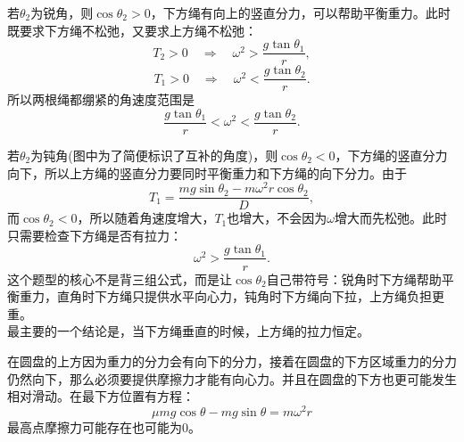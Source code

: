 \begin{casetypebox}[title={\strut\textcolor{white}{\bfseries 常见题型：竖直平面两根绳吊着物体}}]
  若$\theta_2$为锐角，则$\cos\theta_2>0$，下方绳有向上的竖直分力，可以帮助平衡重力。此时既要求下方绳不松弛，又要求上方绳不松弛：
  \[
    T_2>0\quad\Rightarrow\quad
    \omega^2>\frac{g\tan\theta_1}{r},
  \]
  \[
    T_1>0\quad\Rightarrow\quad
    \omega^2<\frac{g\tan\theta_2}{r}.
  \]
  所以两根绳都绷紧的角速度范围是
  \[
    \frac{g\tan\theta_1}{r}<\omega^2<\frac{g\tan\theta_2}{r}.
  \]
\end{casetypebox}

\begin{casetypebox}[title={\strut\textcolor{white}{\bfseries 常见题型：竖直平面两根绳吊着物体}}]
  若$\theta_2$为钝角(图中为了简便标识了互补的角度)，则$\cos\theta_2<0$，下方绳的竖直分力向下，所以上方绳的竖直分力要同时平衡重力和下方绳的向下分力。由于
  \[
    T_1=\frac{mg\sin\theta_2-m\omega^2r\cos\theta_2}{D},
  \]
  而$\cos\theta_2<0$，所以随着角速度增大，$T_1$也增大，不会因为$\omega$增大而先松弛。此时只需要检查下方绳是否有拉力：
  \[
    \omega^2>\frac{g\tan\theta_1}{r}.
  \]
  这个题型的核心不是背三组公式，而是让$\cos\theta_2$自己带符号：锐角时下方绳帮助平衡重力，直角时下方绳只提供水平向心力，钝角时下方绳向下拉，上方绳负担更重。\\
  最主要的一个结论是，当下方绳垂直的时候，上方绳的拉力恒定。
\end{casetypebox}

\begin{casetypebox}[title={\strut\textcolor{white}{\bfseries 常见题型：倾斜圆盘上圆周运动}}]
  在圆盘的上方因为重力的分力会有向下的分力，接着在圆盘的下方区域重力的分力仍然向下，那么必须要提供摩擦力才能有向心力。并且在圆盘的下方也更可能发生相对滑动。在最下方位置有方程：
  \[
    \mu mg\cos\theta-mg\sin\theta=m\omega^2 r
  \]
  最高点摩擦力可能存在也可能为0。
\end{casetypebox}


